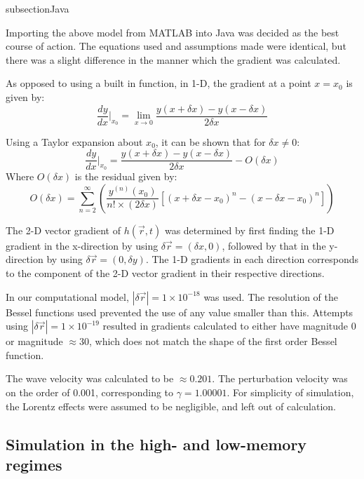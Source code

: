 subsection{Java}

Importing the above model from MATLAB into Java was decided as the best course of action. The equations used and assumptions made were identical, but there was a slight difference in the manner which the gradient was calculated.

As opposed to using a built in function, in 1-D, the gradient at a point $x = x_0$ is given by:
\begin{equation} \frac{dy}{dx}\Bigr|_{x_0} = \lim_{x\to0} \frac{y(x+\delta x)-y(x-\delta x)}{2\delta x}\end{equation}

Using a Taylor expansion about $x_0$, it can be shown that for $\delta x\neq 0$:
\begin{equation} \frac{dy}{dx}\Bigr|_{x_0} = \frac{y(x+\delta x) - y(x-\delta x)}{2\delta x} - O(\delta x)\end{equation}
Where $O(\delta x)$ is the residual given by:
\begin{equation}O(\delta x) = \sum_{n=2}^{\infty} \left( \frac{y^{(n)}(x_0)}{n!\times (2\delta x)} \left[ \left( x+\delta x -x_0 \right)^n - \left(x-\delta x -x_0 \right)^n \right] \right)\end{equation}

The 2-D vector gradient of $h(\vec{r} , t)$ was determined by first finding the 1-D gradient in the x-direction by using $\delta \vec{r} = (\delta x,0)$, followed by that in the y-direction by using $\delta \vec{r} = (0,\delta y)$. The 1-D gradients in each direction corresponds to the component of the 2-D vector gradient in their respective directions. 

In our computational model, $|\delta \vec{r}| = 1\times 10^{-18}$ was used. The resolution of the Bessel functions used prevented the use of any value smaller than this. Attempts using $|\delta \vec{r}| = 1\times 10^{-19}$ resulted in gradients calculated to either have magnitude 0 or magnitude $\approx 30$, which does not match the shape of the first order Bessel function.

The wave velocity was calculated to be $\approx 0.201$. The perturbation velocity was on the order of 0.001, corresponding to $\gamma = 1.00001$. For simplicity of simulation, the Lorentz effects were assumed to be negligible, and left out of calculation.


\subsection{Simulation in the high- and low-memory regimes}


